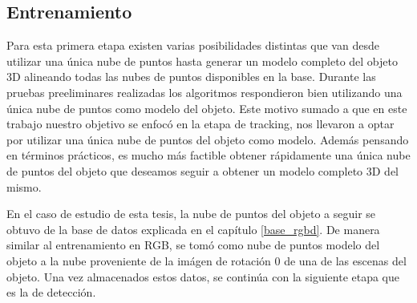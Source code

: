 \subsection{Entrenamiento}
Para esta primera etapa existen varias posibilidades distintas que van desde utilizar una única nube de puntos hasta generar un modelo completo del objeto 3D alineando todas las nubes de puntos disponibles en la base. Durante las pruebas preeliminares realizadas los algoritmos respondieron bien utilizando una única nube de puntos como modelo del objeto. Este motivo sumado a que en este trabajo nuestro objetivo se enfocó en la etapa de tracking, nos llevaron a optar por utilizar una única nube de puntos del objeto como modelo. Además pensando en términos prácticos, es mucho más factible obtener rápidamente una única nube de puntos del objeto que deseamos seguir a obtener un modelo completo 3D del mismo.

En el caso de estudio de esta tesis, la nube de puntos del objeto a seguir se obtuvo de la base de datos explicada en el capítulo \ref{base_rgbd}. De manera similar al entrenamiento en RGB, se tomó como nube de puntos modelo del objeto a la nube proveniente de la imágen de rotación 0 de una de las escenas del objeto. Una vez almacenados estos datos, se continúa con la siguiente etapa que es la de detección.


